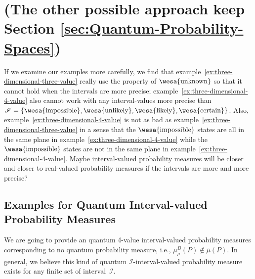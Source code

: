 \documentclass{article}
\theoremstyle{remark}
\newcommand{\imposs}{{\mbox{\wesa{impossible}}}}
\newcommand{\likely}{{\mbox{\wesa{likely}}}}
\newcommand{\unlikely}{{\mbox{\wesa{unlikely}}}}
\newcommand{\necess}{{\mbox{\wesa{certain}}}}
\newcommand{\unknown}{{\mbox{\wesa{unknown}}}}
\begin{document}
\section{(The other possible approach keep Section \ref{sec:Quantum-Probability-Spaces}) }

If we examine our examples more carefully, we find that example~\ref{ex:three-dimensional-three-value}
really use the property of $\unknown$ so that it cannot hold when
the intervals are more precise; example~\ref{ex:three-dimensional-4-value}
also cannot work with any interval-values more precise than $\mathscr{I}=\left\{ \imposs,\unlikely,\likely,\necess\right\} $.
Also, example~\ref{ex:three-dimensional-4-value} is not as bad as
example~\ref{ex:three-dimensional-three-value} in a sense that the
$\imposs$ states are all in the same plane in example~\ref{ex:three-dimensional-4-value}
while the $\imposs$ states are not in the same plane in example~\ref{ex:three-dimensional-4-value}.
Maybe interval-valued probability measures will be closer and closer
to real-valued probability measures if the intervals are more and
more precise?



\subsection{Examples for Quantum Interval-valued Probability Measures}

We are going to provide an quantum 4-value interval-valued probability
measures corresponding to no quantum probability measure, i.e., $\mu_{\rho}^{B}(P)\notin\bar{\mu}(P)$.
In general, we believe this kind of quantum $\mathscr{I}$-interval-valued
probability measure exists for any finite set of interval~$\mathscr{I}$.
\end{document}
